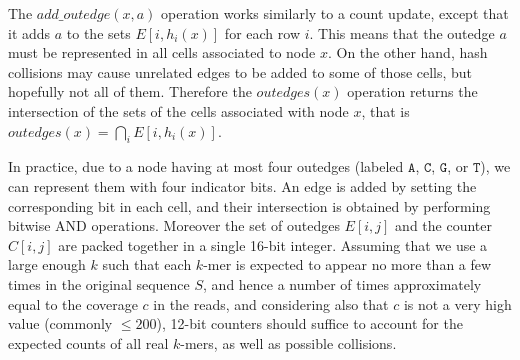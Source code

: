\documentclass[a4paper,12pt]{article}
\newcommand{\dBCM}{DBCM\xspace}
\newcommand{\cm}{CountMin\xspace}
\newcommand{\kmer}{\mbox{$k$-mer}\xspace}
\newcommand{\kmers}{\mbox{$k$-mers}\xspace}
\newcommand{\chr}[1]{\ensuremath{\mathtt{#1}}}
\newcommand{\A}{\chr{A}}
\newcommand{\C}{\chr{C}}
\newcommand{\G}{\chr{G}}
\newcommand{\T}{\chr{T}}
\begin{document}
The $add\_outedge(x,a)$ operation works similarly to a count update, except that it adds $a$ to the sets $E[i,h_i(x)]$ for each row $i$. This means that the outedge $a$ must be represented in all cells associated to node $x$. On the other hand, hash collisions may cause unrelated edges to be added to some of those cells, but hopefully not all of them. Therefore the $outedges(x)$ operation returns the intersection of the sets of the cells associated with node $x$, that is $outedges(x)=\bigcap _i E[i,h_i(x)]$.  




In practice, due to a node having at most four outedges (labeled \A, \C, \G, or \T), we can represent them with four indicator bits. An edge is added by setting the corresponding bit in each cell, and their intersection is obtained by performing bitwise AND operations. Moreover the set of outedges $E[i,j]$ and the counter $C[i,j]$ are packed together in a single 16-bit integer. 
Assuming that we use a large enough $k$ such that each \kmer is expected to appear no more than a few times in the original sequence $S$, and hence a number of times approximately equal to the coverage $c$ in the reads, and considering also that $c$ is not a very high value (commonly $\leq 200$), 12-bit counters should suffice to account for the expected counts of all real \kmers, as well as possible collisions.
\end{document}
